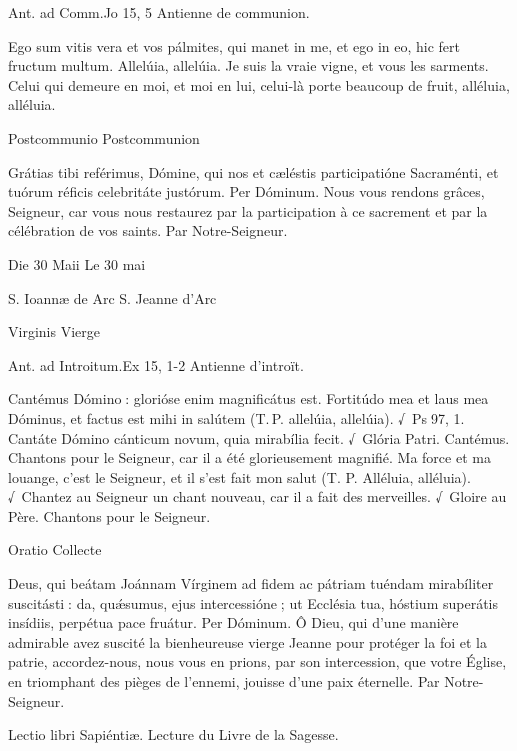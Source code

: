 \begin{paracol}{2}
Ant. ad Comm.\hfill Jo 15, 5
\switchcolumn
Antienne de communion.
\switchcolumn*

Ego sum vitis vera et vos pálmites, qui manet in me, et ego in eo, hic fert fructum multum. Allelúia, allelúia.
\switchcolumn
Je suis la vraie vigne, et vous les sarments. Celui qui demeure en moi, et moi en lui, celui-là porte beaucoup de fruit, alléluia, alléluia.
\switchcolumn*

Postcommunio
\switchcolumn
Postcommunion
\switchcolumn*

Grátias tibi reférimus, Dómine,  qui nos et cæléstis participatióne Sacraménti, et tuórum réficis celebritáte justórum. Per Dóminum.
\switchcolumn
Nous vous rendons grâces, Seigneur, car  vous nous restaurez par la participation à ce sacrement et par la célébration de vos saints. Par Notre-Seigneur.
\switchcolumn*

Die 30 Maii
\switchcolumn
Le 30 mai
\switchcolumn*

S. Ioannæ de Arc
\switchcolumn
S. Jeanne d’Arc
\switchcolumn*

Virginis
\switchcolumn
Vierge
\switchcolumn*

Ant. ad Introitum.\hfill Ex 15, 1-2
\switchcolumn
Antienne d’introït.
\switchcolumn*

Cantémus Dómino : glorióse enim  magnificátus est. Fortitúdo mea et laus mea Dóminus, et factus est mihi in salútem (T. P. allelúia, allelúia). √~Ps 97, 1. Cantáte Dómino cánticum novum, quia mirabília fecit. √~Glória Patri. Cantémus.
\switchcolumn
Chantons pour le Seigneur, car il a été  glorieusement magnifié. Ma force et ma louange, c’est le Seigneur, et il s’est fait mon salut (T. P. Alléluia, alléluia). √~Chantez au Seigneur un chant nouveau, car il a fait des merveilles. √~Gloire au Père. Chantons pour le Seigneur.
\switchcolumn*

Oratio
\switchcolumn
Collecte
\switchcolumn*

Deus, qui beátam Joánnam  Vírginem ad fidem ac pátriam tuéndam mirabíliter suscitásti : da, quǽsumus, ejus intercessióne ; ut Ecclésia tua, hóstium superátis insídiis, perpétua pace fruátur. Per Dóminum.
\switchcolumn
Ô Dieu, qui d’une manière admirable  avez suscité la bienheureuse vierge Jeanne pour protéger la foi et la patrie, accordez-nous, nous vous en prions, par son intercession, que votre Église, en triomphant des pièges de l’ennemi, jouisse d’une paix éternelle. Par Notre-Seigneur.
\switchcolumn*

Lectio libri Sapiéntiæ.
\switchcolumn
Lecture du Livre de la Sagesse.
\switchcolumn*


\end{paracol}
